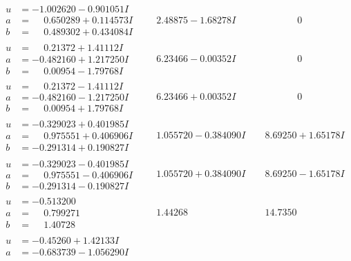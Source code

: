 \documentclass[1p]{elsarticle_modified}
\theoremstyle{definition}
\begin{document}
$$\begin{array}{c|c|c}
\begin{aligned}
u &= -1.002620 - 0.901051 I \\
a &= \phantom{-}0.650289 + 0.114573 I \\
b &= \phantom{-}0.489302 + 0.434084 I\end{aligned}
 & \phantom{-}2.48875 - 1.68278 I & \phantom{-0.000000 } 0 \\ \hline\begin{aligned}
u &= \phantom{-}0.21372 + 1.41112 I \\
a &= -0.482160 + 1.217250 I \\
b &= \phantom{-}0.00954 - 1.79768 I\end{aligned}
 & \phantom{-}6.23466 - 0.00352 I & \phantom{-0.000000 } 0 \\ \hline\begin{aligned}
u &= \phantom{-}0.21372 - 1.41112 I \\
a &= -0.482160 - 1.217250 I \\
b &= \phantom{-}0.00954 + 1.79768 I\end{aligned}
 & \phantom{-}6.23466 + 0.00352 I & \phantom{-0.000000 } 0 \\ \hline\begin{aligned}
u &= -0.329023 + 0.401985 I \\
a &= \phantom{-}0.975551 + 0.406906 I \\
b &= -0.291314 + 0.190827 I\end{aligned}
 & \phantom{-}1.055720 - 0.384090 I & \phantom{-}8.69250 + 1.65178 I \\ \hline\begin{aligned}
u &= -0.329023 - 0.401985 I \\
a &= \phantom{-}0.975551 - 0.406906 I \\
b &= -0.291314 - 0.190827 I\end{aligned}
 & \phantom{-}1.055720 + 0.384090 I & \phantom{-}8.69250 - 1.65178 I \\ \hline\begin{aligned}
u &= -0.513200\phantom{ +0.000000I} \\
a &= \phantom{-}0.799271\phantom{ +0.000000I} \\
b &= \phantom{-}1.40728\phantom{ +0.000000I}\end{aligned}
 & \phantom{-}1.44268\phantom{ +0.000000I} & \phantom{-}14.7350\phantom{ +0.000000I} \\ \hline\begin{aligned}
u &= -0.45260 + 1.42133 I \\
a &= -0.683739 - 1.056290 I \\

\end{aligned}
\end{array}$$
\end{document}
